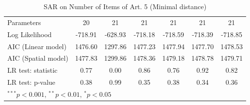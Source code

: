 \begin{table}[!h]
\begin{center}
\begin{tabular}{l c c c c c c }
Parameters              & 20           & 21           & 21           & 21           & 21           & 21           \\
Log Likelihood          & -718.91      & -628.93      & -718.18      & -718.59      & -718.39      & -718.85      \\
AIC (Linear model)      & 1476.60      & 1297.86      & 1477.23      & 1477.94      & 1477.70      & 1478.53      \\
AIC (Spatial model)     & 1477.83      & 1299.86      & 1478.36      & 1479.18      & 1478.78      & 1479.71      \\
LR test: statistic      & 0.77         & 0.00         & 0.86         & 0.76         & 0.92         & 0.82         \\
LR test: p-value        & 0.38         & 0.99         & 0.35         & 0.38         & 0.34         & 0.36         \\
\bottomrule
\multicolumn{7}{l}{\scriptsize{$^{***}p<0.001$, $^{**}p<0.01$, $^*p<0.05$}}
\end{tabular}
\caption{SAR on Number of Items of Art. 5 (Minimal distance)}
\label{table:coefficients}
\end{center}
\end{table}
